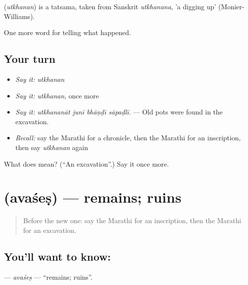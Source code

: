 \begin{cousinweb}
\textbf{} (\emph{utkhanan}) is a tatsama, taken from Sanskrit \emph{utkhanana}, 'a digging up' (Monier-Williams).
\end{cousinweb}

\begin{grammarlens}[title={What you've built}]
One more word for telling what happened.
\end{grammarlens}

\subsection*{Your turn}
\begin{itemize}
\raggedright
  \item \emph{Say it:} \emph{utkhanan}
  \item \emph{Say it:} \emph{utkhanan}, once more
  \item \emph{Say it:} \emph{utkhananāt junī bhāṇḍī sāpaḍlī.} — Old pots were found in the excavation.
  \item \emph{Recall:} say the Marathi for a chronicle, then the Marathi for an inscription, then say \emph{utkhanan} again
\end{itemize}

\begin{tcolorbox}[breakable,colback=teal!4,colframe=teal!35!black,title={Before you move on}]
What does  mean? (\textquotedblleft{}An excavation\textquotedblright{}.) Say it once more.
\end{tcolorbox}
\section[\texorpdfstring{\mr{अवशेष} (avaśeṣ)}{अवशेष (avaśeṣ)}]{ (avaśeṣ) — remains; ruins}

\label{lesson:MR-C335-avases}



\begin{quote}
Before the new one: say the Marathi for an inscription, then the Marathi for an excavation.
\end{quote}

\subsection*{You'll want to know: }
\textbf{} — \emph{avaśeṣ} — \textquotedblleft{}remains; ruins\textquotedblright{}.

